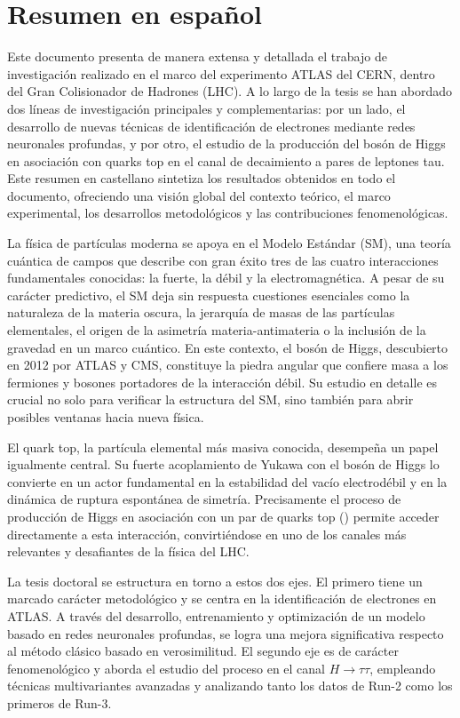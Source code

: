 
\chapter*{Resumen en español}

Este documento presenta de manera extensa y detallada el trabajo de investigación realizado en el marco
del experimento ATLAS del CERN, dentro del Gran Colisionador de Hadrones (LHC). A lo largo de la tesis se han
abordado dos líneas de investigación principales y complementarias: por un lado, el desarrollo de nuevas técnicas
de identificación de electrones mediante redes neuronales profundas, y por otro, el estudio de la producción del
bosón de Higgs en asociación con quarks top en el canal de decaimiento a pares de leptones tau. Este resumen en
castellano sintetiza los resultados obtenidos en todo el documento, ofreciendo una visión global del contexto
teórico, el marco experimental, los desarrollos metodológicos y las contribuciones fenomenológicas. 

La física de partículas moderna se apoya en el Modelo Estándar (SM), una teoría cuántica de campos que describe
con gran éxito tres de las cuatro interacciones fundamentales conocidas: la fuerte, la débil y la electromagnética.
A pesar de su carácter predictivo, el SM deja sin respuesta cuestiones esenciales como la naturaleza de la materia
oscura, la jerarquía de masas de las partículas elementales, el origen de la asimetría materia-antimateria o la
inclusión de la gravedad en un marco cuántico. En este contexto, el bosón de Higgs, descubierto en 2012 por ATLAS
y CMS, constituye la piedra angular que confiere masa a los fermiones y bosones portadores de la interacción débil.
Su estudio en detalle es crucial no solo para verificar la estructura del SM, sino también para abrir posibles
ventanas hacia nueva física.

El quark top, la partícula elemental más masiva conocida, desempeña un papel igualmente central. Su fuerte
acoplamiento de Yukawa con el bosón de Higgs lo convierte en un actor fundamental en la estabilidad del vacío
electrodébil y en la dinámica de ruptura espontánea de simetría. Precisamente el proceso de producción de Higgs en
asociación con un par de quarks top (\ttH) permite acceder directamente a esta interacción, convirtiéndose en uno
de los canales más relevantes y desafiantes de la física del LHC.

La tesis doctoral se estructura en torno a estos dos ejes. El primero tiene un marcado carácter metodológico y se
centra en la identificación de electrones en ATLAS. A través del desarrollo, entrenamiento y optimización de un
modelo basado en redes neuronales profundas, se logra una mejora significativa respecto al método clásico basado
en verosimilitud. El segundo eje es de carácter fenomenológico y aborda el estudio del proceso \ttH en el canal
$H\to\tau\tau$, empleando técnicas multivariantes avanzadas y analizando tanto los datos de Run-2 como los
primeros de Run-3.

